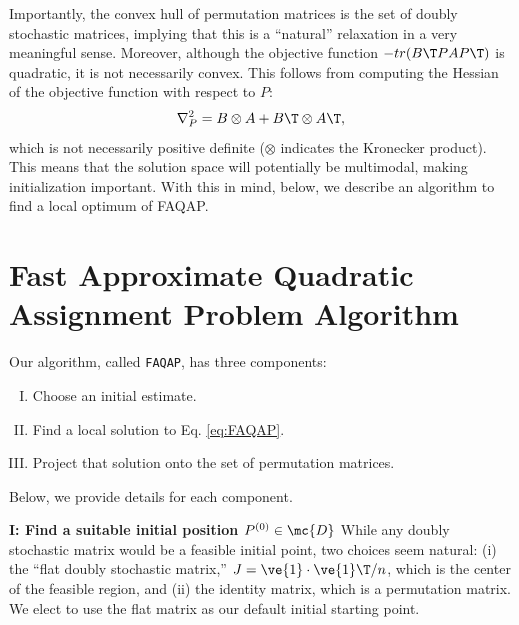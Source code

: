 \documentclass[10pt,journal,cspaper,compsoc]{IEEEtran}
\begin{document}
Importantly, the convex hull of permutation matrices is the set of doubly stochastic matrices, implying that this is a ``natural'' relaxation in a very meaningful sense.    Moreover, although the objective function $- tr(B\T PAP\T)$ is quadratic, it is not necessarily convex.  This follows from computing the Hessian of the objective function with respect to $P$:
\begin{align}
	\nabla_P^2  =  B \otimes A + B\T \otimes A\T,
\end{align}
which is not necessarily positive definite ($\otimes$ indicates the Kronecker product). This means that the solution space will potentially be multimodal, making initialization important.  With this in mind, below, we describe an algorithm to find a local optimum of FAQAP.








\section{Fast Approximate Quadratic Assignment Problem Algorithm} %
\label{ssub:graph_matching}


Our algorithm, called \texttt{FAQAP}, has three components:
\begin{enumerate}[I.]
	\item Choose an initial estimate.
	\item Find a local solution to Eq. \eqref{eq:FAQAP}.
	\item Project that solution onto the set of permutation matrices.
\end{enumerate}
Below, we provide details for each component.

\textbf{I: Find a suitable initial position $P^{(0)} \in \mc{D}$}  While any doubly stochastic matrix would be a feasible initial point, two choices seem natural: (i) the ``flat doubly  stochastic matrix,'' $J=\ve{1} \cdot \ve{1}\T/n$, which is the center of the feasible region, and (ii) the identity matrix, which is a permutation matrix.  We elect to use the flat matrix as our default initial starting point.
\end{document}
